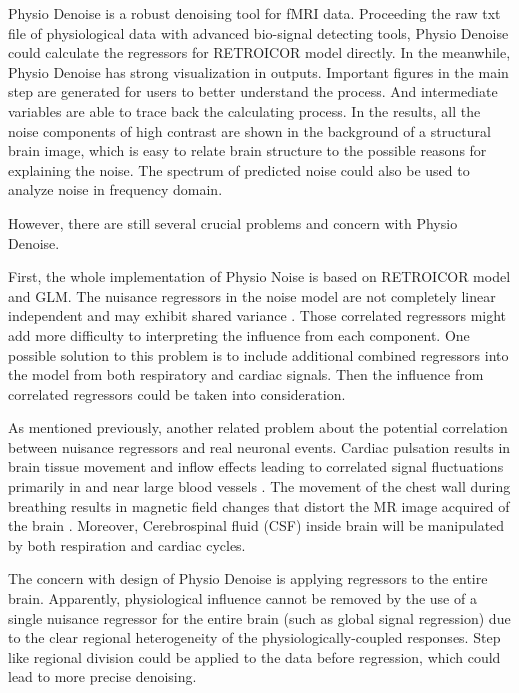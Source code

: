 Physio Denoise is a robust denoising tool for fMRI data. 
Proceeding the raw txt file of physiological data with advanced bio-signal detecting tools, 
Physio Denoise could calculate the regressors for RETROICOR model directly.
In the meanwhile, Physio Denoise has strong visualization in outputs.
Important figures in the main step are generated for users to better understand the process.
And intermediate variables are able to trace back the calculating process.
In the results, all the noise components of high contrast 
are shown in the background of a structural brain image, which
is easy to relate brain structure to the possible reasons for explaining the noise.
The spectrum of predicted noise could also be used to analyze noise in frequency domain.

However, there are still several crucial problems and concern with Physio Denoise.

First, the whole implementation of Physio Noise is based on RETROICOR model and GLM. 
The nuisance regressors in the noise model are not completely linear independent 
and may exhibit shared variance \cite{bright2017potential}.
Those correlated regressors might 
add more difficulty to interpreting the influence from each component.
One possible solution to this problem is to include additional combined regressors into the model
from both respiratory and cardiac signals. Then the influence from correlated regressors 
could be taken into consideration. 

As mentioned previously, another related problem about the potential correlation 
between nuisance regressors and real neuronal events. 
Cardiac pulsation results in brain tissue movement and 
inflow effects leading to correlated signal fluctuations primarily 
in and near large blood vessels \cite{dagli1999localization}. The movement of the chest wall during breathing results 
in magnetic field changes that distort the MR image acquired of the brain \cite{brosch2002simulation}.
Moreover, Cerebrospinal fluid (CSF) inside brain will be manipulated by both respiration and cardiac cycles.

The concern with design of Physio Denoise is applying regressors to the entire brain. 
Apparently, physiological influence cannot be removed by the use of a single nuisance regressor 
for the entire brain (such as global signal regression) due to the 
clear regional heterogeneity of the physiologically-coupled responses. \cite{chen2020resting}
Step like regional division could be applied to the data before regression, which could lead to more precise
denoising.

